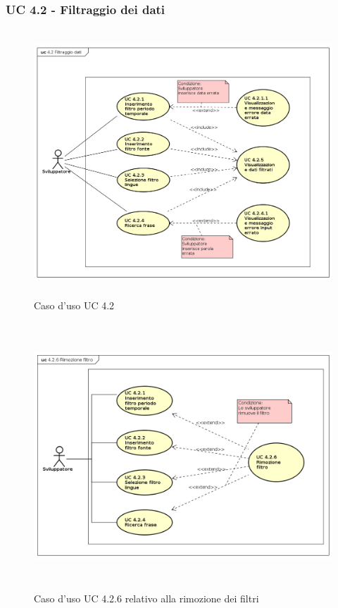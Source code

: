 \subsubsection{UC 4.2 - Filtraggio dei dati}
\begin{figure}[H]
\centering
\includegraphics[width=17cm, height=10cm]{img/UC420.png} 
\caption{Caso d'uso UC 4.2}\label{fig:420}
\end{figure}
\begin{figure}[H]
\centering
\includegraphics[width=17cm, height=10cm]{img/UC426.png} 
\caption{Caso d'uso UC 4.2.6 relativo alla rimozione dei filtri}\label{fig:426}
\end{figure}

